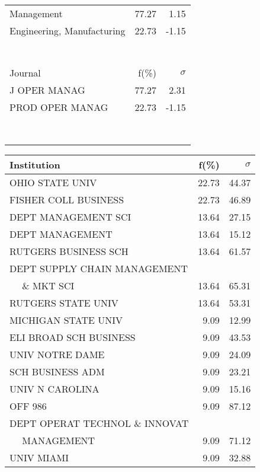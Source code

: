 \documentclass[a4paper,11pt]{report}
\begin{document}
\begin{landscape}
\begin{table}[!ht]
{\begin{tabular}{|l r  r|}
Management & 77.27 & 1.15\\
Engineering, Manufacturing & 22.73 & -1.15\\
 &  & \\
 &  & \\
 &  & \\
 &  & \\
 &  & \\
 &  & \\
 &  & \\
\hline
\hline
Journal & f(\%) & $\sigma$\\
\hline
J OPER MANAG & 77.27 & 2.31\\
PROD OPER MANAG & 22.73 & -1.15\\
 &  & \\
 &  & \\
 &  & \\
 &  & \\
 &  & \\
 &  & \\
 &  & \\
 &  & \\
\hline
\end{tabular}
}
{\scriptsize\begin{tabular}{|l r r|}
\hline
Institution & f(\%) & $\sigma$\\
\hline
OHIO STATE UNIV & 22.73 & 44.37\\
FISHER COLL BUSINESS & 22.73 & 46.89\\
DEPT MANAGEMENT SCI & 13.64 & 27.15\\
DEPT MANAGEMENT & 13.64 & 15.12\\
RUTGERS BUSINESS SCH & 13.64 & 61.57\\
DEPT SUPPLY CHAIN MANAGEMENT &  & \\
$\quad$ \& MKT SCI & 13.64 & 65.31\\
RUTGERS STATE UNIV & 13.64 & 53.31\\
MICHIGAN STATE UNIV & 9.09 & 12.99\\
ELI BROAD SCH BUSINESS & 9.09 & 43.53\\
UNIV NOTRE DAME & 9.09 & 24.09\\
SCH BUSINESS ADM & 9.09 & 23.21\\
UNIV N CAROLINA & 9.09 & 15.16\\
OFF 986 & 9.09 & 87.12\\
DEPT OPERAT TECHNOL \& INNOVAT &  & \\
$\quad$ MANAGEMENT & 9.09 & 71.12\\
UNIV MIAMI & 9.09 & 32.88\\

\end{tabular}}
\end{table}
\end{landscape}
\end{document}

